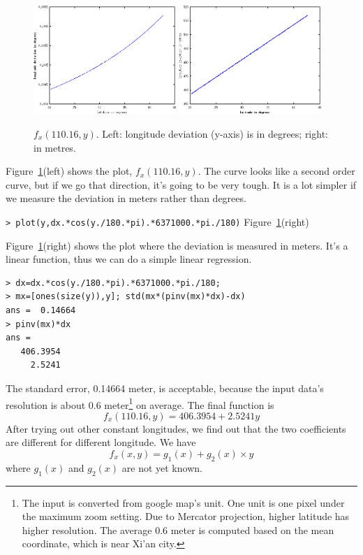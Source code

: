 \documentclass[a4paper]{article}
\begin{document}
\begin{figure}[htb]
\begin{center}
\includegraphics[width=0.48\textwidth]{fxy-degree.png}
\includegraphics[width=0.48\textwidth]{fxy-metre.png}
\end{center}
\caption{$f_x(110.16,y)$. Left: longitude deviation (y-axis) is in degrees;
right: in metres.}
\label{fig:fxy-degree}
\end{figure}

Figure~\ref{fig:fxy-degree}(left) shows the plot, $f_x(110.16,y)$. The curve
looks like a second order curve, but if we go that direction, it's going to be
very tough.
It is a lot simpler if we measure the deviation in meters rather
than degrees.

\noindent
\verb|> plot(y,dx.*cos(y./180.*pi).*6371000.*pi./180)| \hfill
Figure~\ref{fig:fxy-degree}(right)

Figure~\ref{fig:fxy-degree}(right) shows the plot where the deviation is
measured in meters.
It's a linear function, thus we can do a simple linear regression.
\begin{verbatim}
> dx=dx.*cos(y./180.*pi).*6371000.*pi./180;
> mx=[ones(size(y)),y]; std(mx*(pinv(mx)*dx)-dx)
ans =  0.14664
> pinv(mx)*dx
ans =
   406.3954
     2.5241
\end{verbatim}
The standard error, 0.14664 meter, is acceptable, because the input data's
resolution is about 0.6 meter\footnote{The input is converted from google map's
unit. One unit is one pixel under the maximum zoom setting. Due to Mercator
projection, higher latitude has higher resolution. The average 0.6 meter is
computed based on the mean coordinate, which is near Xi'an city.} on average.
The final function is
\begin{equation}
f_x(110.16,y)=406.3954+2.5241y
\end{equation}
After trying out other constant longitudes,
we find out that the two coefficients are different for different longitude.
We have
\begin{equation}
f_x(x,y)=g_1(x)+g_2(x)\times y
\label{eq:fxy}
\end{equation}
where $g_1(x)$ and $g_2(x)$ are not yet known.
\end{document}

